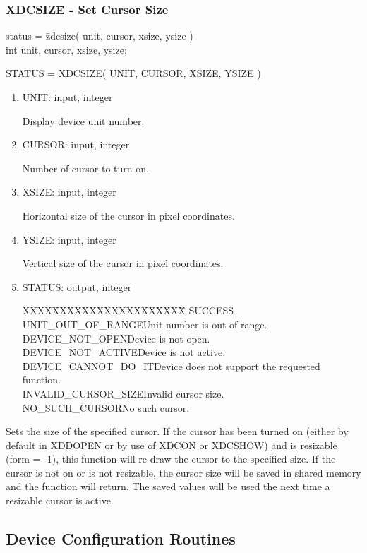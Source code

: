 \subsubsection{XDCSIZE - Set Cursor Size}
\begin{tabbing}
status = \=zdcsize( unit, cursor, xsize, ysize )\\
\>int  unit, cursor, xsize, ysize;\\
\end{tabbing}
STATUS = XDCSIZE( UNIT, CURSOR, XSIZE, YSIZE )
\begin{enumerate}
\item UNIT:  input, integer

Display device unit number.
\item CURSOR:  input, integer

Number of cursor to turn on.
\item XSIZE:  input, integer

Horizontal size of the cursor in pixel coordinates.
\item YSIZE:  input, integer

Vertical size of the cursor in pixel coordinates.
\item STATUS:  output, integer
\begin{tabbing}
XXXXXXXXXXXXXXXXXXXXXX\=\kill
SUCCESS\\
UNIT\_OUT\_OF\_RANGE\>Unit number is out of range.\\
DEVICE\_NOT\_OPEN\>Device is not open.\\
DEVICE\_NOT\_ACTIVE\>Device is not active.\\
DEVICE\_CANNOT\_DO\_IT\>Device does not support the requested function.\\
INVALID\_CURSOR\_SIZE\>Invalid cursor size.\\
NO\_SUCH\_CURSOR\>No such cursor.\\
\end{tabbing}
\end{enumerate}
Sets the size of the specified cursor.  If the cursor has been turned
on (either by default in XDDOPEN or by use of XDCON or XDCSHOW) and is
resizable (form = -1), this function will re-draw the cursor to the
specified size.  If the cursor is not on or is not resizable, the cursor
size will be saved in shared memory and the function will return.  The
saved values will be used the next time a resizable cursor is active.
\newpage
\subsection{Device Configuration Routines}
